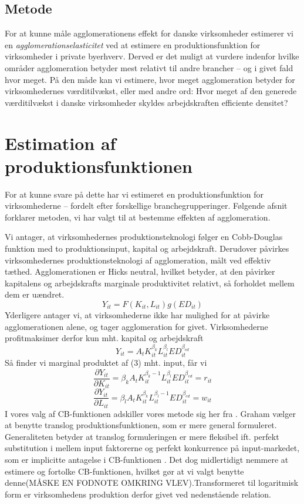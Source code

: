 \subsection{Metode}
For at kunne måle agglomerationens effekt for danske virksomheder estimerer vi en \emph{agglomerationselasticitet} ved at estimere en produktionsfunktion for virksomheder i private byerhverv. Derved er det muligt at vurdere indenfor hvilke områder agglomeration betyder mest relativt til andre brancher -- og i givet fald hvor meget. På den måde kan vi estimere, hvor meget agglomeration betyder for virksomhedernes værditilvækst, eller med andre ord: Hvor meget af den generede værditilvækst i danske virksomheder skyldes arbejdskraften efficiente densitet?
\section{Estimation af produktionsfunktionen}
For at kunne svare på dette har vi estimeret en produktionsfunktion for virksomhederne -- fordelt efter forskellige branchegrupperinger. Følgende afsnit forklarer metoden, vi har valgt til at bestemme effekten af agglomeration.

Vi antager, at virksomhedernes produktionsteknologi følger en Cobb-Douglas funktion med to produktionsinput, kapital og arbejdskraft. Derudover påvirkes virksomhedernes produktionsteknologi af agglomeration, målt ved effektiv tæthed. Agglomerationen er Hicks neutral, hvilket betyder, at den påvirker kapitalens og arbejdskrafts marginale produktivitet relativt, så forholdet mellem dem er uændret.
\begin{equation}
Y_{it} = F(K_{it},L_{it})g(ED_{it}) 
\end{equation}
Yderligere antager vi, at virksomhederne ikke har mulighed for at påvirke agglomerationen alene, og tager agglomeration for givet.  Virksomhederne profitmaksimer derfor kun mht. kapital og arbejdskraft
\begin{equation}
	Y_{it} = A_t K_{it}^{\beta_k} L_{it}^{\beta_l} 
	ED_{it}^{\beta_{ed}}  
\end{equation}
Så finder vi marginal produktet af (3) mht. input, får vi 
\begin{equation}
\frac{\partial Y_{it}}{\partial K_{it}} = \beta_k A_t K_{it}^{\beta_k-1} L_{it}^{\beta_l} 
ED_{it}^{\beta_{ed}}=r_{it}
\end{equation}
\begin{equation}
\frac{\partial Y_{it}}{\partial L_{it}} = \beta_l A_t K_{it}^{\beta_k} L_{it}^{\beta_l-1} 
ED_{it}^{\beta_{ed}} = w_{it}
\end{equation}
 I vores valg af CB-funktionen adskiller vores metode sig her fra \cite{graham2007agglomeration}. Graham vælger at benytte translog produktionsfunktionen, som er mere general formuleret. Generaliteten betyder at translog formuleringen er mere fleksibel ift. perfekt substitution i mellem input faktorerne og perfekt konkurrence på input-markedet, som er implicitte antagelse i CB-funktionen \cite{pavelescu2011some}. Det dog midlertidigt nemmere at estimere og fortolke CB-funktionen, hvilket gør at vi valgt benytte denne(MÅSKE EN FODNOTE OMKRING VLEV).Transformeret til logaritmisk form er virksomhedens produktion derfor givet ved nedenstående relation.


